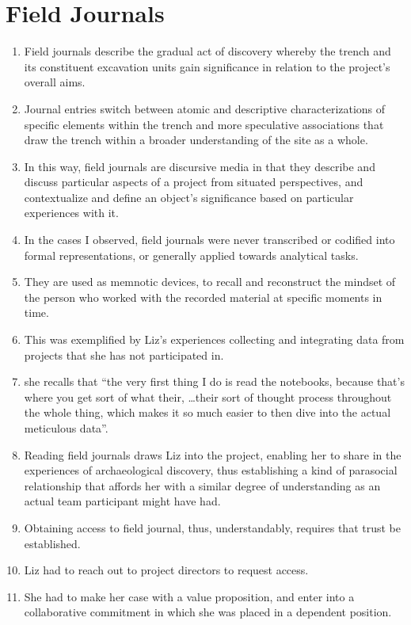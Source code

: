 \documentclass{article}
\begin{document}
\section{Field Journals}
\begin{enumerate}
  \item Field journals describe the gradual act of discovery whereby the trench and its constituent excavation units gain significance in relation to the project's overall aims.
  \item Journal entries switch between atomic and descriptive characterizations of specific elements within the trench and more speculative associations that draw the trench within a broader understanding of the site as a whole.
  \item In this way, field journals are discursive media in that they describe and discuss particular aspects of a project from situated perspectives, and contextualize and define an object's significance based on particular experiences with it.
  \item In the cases I observed, field journals were never transcribed or codified into formal representations, or generally applied towards analytical tasks.
  \item They are used as memnotic devices, to recall and reconstruct the mindset of the person who worked with the recorded material at specific moments in time.
  \item This was exemplified by Liz's experiences collecting and integrating data from projects that she has not participated in.
  \item she recalls that ``the very first thing I do is read the notebooks, because that’s where you get sort of what their, \dots their sort of thought process throughout the whole thing, which makes it so much easier to then dive into the actual meticulous data''.
  \item Reading field journals draws Liz into the project, enabling her to share in the experiences of archaeological discovery, thus establishing a kind of parasocial relationship that affords her with a similar degree of understanding as an actual team participant might have had.
  \item Obtaining access to field journal, thus, understandably, requires that trust be established.
  \item Liz had to reach out to project directors to request access.
  \item She had to make her case with a value proposition, and enter into a collaborative commitment in which she was placed in a dependent position.
  

\end{enumerate}
\end{document}
